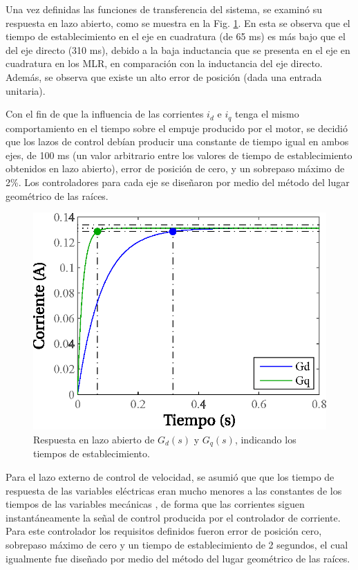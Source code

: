Una vez definidas las funciones de transferencia del sistema, se examinó su respuesta en lazo abierto, como se muestra en la Fig. \ref{fig:openloop}. En esta se observa que el tiempo de establecimiento en el eje en cuadratura (de 65 ms) es más bajo que el del eje directo (310 ms), debido a la baja inductancia que se presenta en el eje en cuadratura en los MLR, en comparación con la inductancia del eje directo. Además, se observa que existe un alto error de posición (dada una entrada unitaria).

Con el fin de que la influencia de las corrientes $i_d$ e $i_q$ tenga el mismo comportamiento en el tiempo sobre el empuje producido por el motor, se decidió que los lazos de control debían producir una constante de tiempo igual en ambos ejes, de 100 ms (un valor arbitrario entre los valores de tiempo de establecimiento obtenidos en lazo abierto), error de posición de cero, y un sobrepaso máximo de 2\%. Los controladores para cada eje se diseñaron por medio del método del lugar geométrico de las raíces.

\begin{figure}[t]
\centering
\includegraphics[scale=0.8]{../img/Diseno_de_un_controlador_de_velocidad/openloop.eps}
\caption{Respuesta en lazo abierto de $G_d(s)$ y $G_q(s)$, indicando los tiempos de establecimiento.}
\label{fig:openloop}
\end{figure}

Para el lazo externo de control de velocidad, se asumió que que los tiempo de respuesta de las variables eléctricas eran mucho menores a las constantes de los tiempos de las variables mecánicas \cite{jeanpaul2011}, de forma que las corrientes siguen instantáneamente la señal de control producida por el controlador de corriente. Para este controlador los requisitos definidos fueron error de posición cero, sobrepaso máximo de cero y un tiempo de establecimiento de 2 segundos, el cual igualmente fue diseñado por medio del método del lugar geométrico de las raíces.


